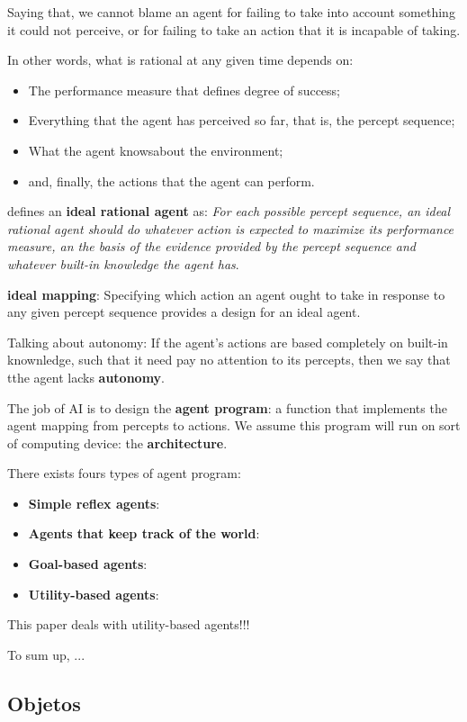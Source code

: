 Saying that, we cannot blame an agent for failing to take into account something it could not perceive, or for failing to take an action that it is incapable of taking.

In other words, what is rational at any given time depends on:
\begin{itemize}
    \item The performance measure that defines degree of success;
    \item Everything that the agent has perceived so far, that is, the percept sequence;
    \item What the agent knowsabout the environment;
    \item and, finally, the actions that the agent can perform.
\end{itemize}

\cite{ref:russell1995aima} defines an \textbf{ideal rational agent} as: \textit{For each possible percept sequence, an ideal rational agent should do whatever action is expected to maximize its performance measure, an the basis of the evidence provided by the percept sequence and whatever built-in knowledge the agent has}.

\textbf{ideal mapping}: Specifying which action an agent ought to take in response to any given percept sequence provides a design for an ideal agent.

Talking about autonomy: If the agent's actions are based completely on built-in knownledge, such that it need pay no attention to its percepts, then we say that tthe agent lacks \textbf{autonomy}.

The job of AI is to design the \textbf{agent program}: a function that implements the agent mapping from percepts to actions. We assume this program will run on sort of computing device: the \textbf{architecture}.

There exists fours types of agent program:
\begin{itemize}
    \item \textbf{Simple reflex agents}:
    \item \textbf{Agents that keep track of the world}:
    \item \textbf{Goal-based agents}:
    \item \textbf{Utility-based agents}:
\end{itemize}

This paper deals with utility-based agents!!!

To sum up, ...


\subsection{Objetos}

